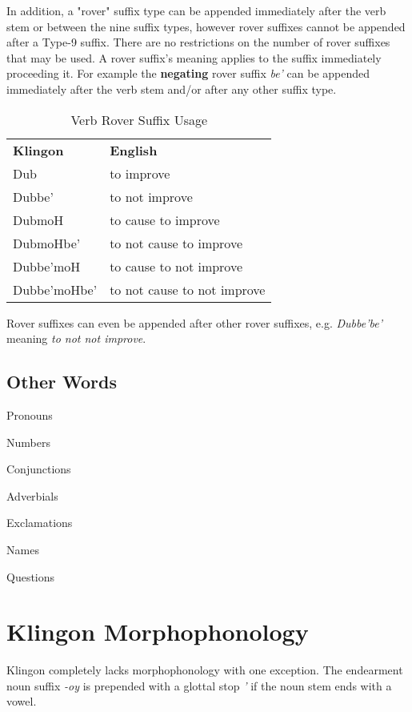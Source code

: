 \documentclass[11pt]{article}
\begin{document}
In addition, a "rover" suffix type can be appended immediately after the verb stem or between the nine suffix types, however rover suffixes cannot be appended after a Type-9 suffix. There are no restrictions on the number of rover suffixes that may be used. A rover suffix's meaning applies to the suffix immediately proceeding it. For example the \textbf{negating} rover suffix \textit{be'} can be appended immediately after the verb stem and/or after any other suffix type.

\begin{table}[h]
\begin{center}
\begin{tabular}{l|l}
\bf Klingon & \bf English \\
Dub & to improve \\
Dubbe' & to not improve \\
DubmoH & to cause to improve \\
DubmoHbe' & to not cause to improve \\
Dubbe'moH & to cause to not improve \\
Dubbe'moHbe' & to not cause to not improve
\end{tabular}
\end{center}
\caption{Verb Rover Suffix Usage }
\end{table}

Rover suffixes can even be appended after other rover suffixes, e.g. \textit{Dubbe'be'} meaning \textit{to not not improve}.

\subsection {Other Words}

Pronouns

Numbers

Conjunctions

Adverbials

Exclamations

Names

Questions

\section{Klingon Morphophonology}

Klingon completely lacks morphophonology with one exception. The endearment noun suffix \textit{-oy} is prepended with a glottal stop \textit{'} if the noun stem ends with a vowel.
\end{document}
